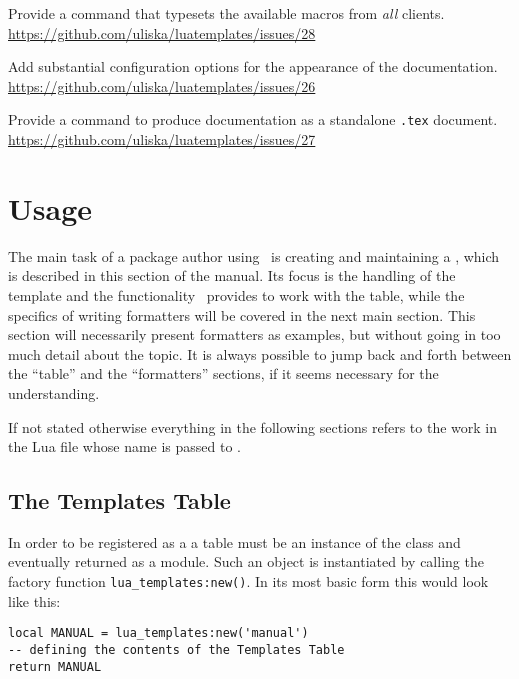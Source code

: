 \documentclass[12pt]{scrartcl}
\begin{document}
\begin{itemize*}
\item Provide a command that typesets the available macros from \emph{all} clients.\\
\url{https://github.com/uliska/luatemplates/issues/28}
\item Add substantial configuration options for the appearance of the documentation.\\
\url{https://github.com/uliska/luatemplates/issues/26}
\item Provide a command to produce documentation as a standalone \texttt{.tex} document.\\
\url{https://github.com/uliska/luatemplates/issues/27}
\end{itemize*}



\section{Usage}
\label{sec:usage}

The main task of a package author using \luatemplates\ is creating and
maintaining a , which is described in this section of the
manual.  Its focus is the handling of the template and the functionality
\luatemplates\ provides to work with the table, while the specifics of
writing formatters will be covered in the next main section.  This section will
necessarily present formatters as examples, but without going in too much detail
about the topic.  It is always possible to jump back and forth between the
“table” and the “formatters” sections, if it seems necessary for the
understanding.

If not stated otherwise everything in the following sections refers to the work
in the Lua file whose name is passed to \texttt{\addLuaTemplates{}}.

\subsection{The Templates Table}
\label{sec:usage:templates-table}

In order to be registered as a  a table must be an instance of the
 class and eventually returned as a module.  Such an object is instantiated by calling the factory
function \texttt{lua_templates:new()}.  In its most basic form this would look like this:

\begin{verbatim}
local MANUAL = lua_templates:new('manual')
-- defining the contents of the Templates Table
return MANUAL
\end{verbatim}
\end{document}
